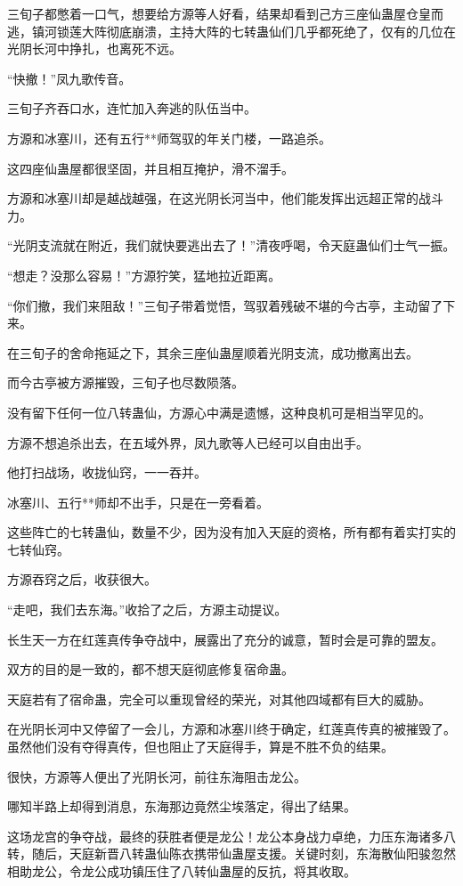 \begin{this_body}
三旬子都憋着一口气，想要给方源等人好看，结果却看到己方三座仙蛊屋仓皇而逃，镇河锁莲大阵彻底崩溃，主持大阵的七转蛊仙们几乎都死绝了，仅有的几位在光阴长河中挣扎，也离死不远。

“快撤！”凤九歌传音。

三旬子齐吞口水，连忙加入奔逃的队伍当中。

方源和冰塞川，还有五行**师驾驭的年关门楼，一路追杀。

这四座仙蛊屋都很坚固，并且相互掩护，滑不溜手。

方源和冰塞川却是越战越强，在这光阴长河当中，他们能发挥出远超正常的战斗力。

“光阴支流就在附近，我们就快要逃出去了！”清夜呼喝，令天庭蛊仙们士气一振。

“想走？没那么容易！”方源狞笑，猛地拉近距离。

“你们撤，我们来阻敌！”三旬子带着觉悟，驾驭着残破不堪的今古亭，主动留了下来。

在三旬子的舍命拖延之下，其余三座仙蛊屋顺着光阴支流，成功撤离出去。

而今古亭被方源摧毁，三旬子也尽数陨落。

没有留下任何一位八转蛊仙，方源心中满是遗憾，这种良机可是相当罕见的。

方源不想追杀出去，在五域外界，凤九歌等人已经可以自由出手。

他打扫战场，收拢仙窍，一一吞并。

冰塞川、五行**师却不出手，只是在一旁看着。

这些阵亡的七转蛊仙，数量不少，因为没有加入天庭的资格，所有都有着实打实的七转仙窍。

方源吞窍之后，收获很大。

“走吧，我们去东海。”收拾了之后，方源主动提议。

长生天一方在红莲真传争夺战中，展露出了充分的诚意，暂时会是可靠的盟友。

双方的目的是一致的，都不想天庭彻底修复宿命蛊。

天庭若有了宿命蛊，完全可以重现曾经的荣光，对其他四域都有巨大的威胁。

在光阴长河中又停留了一会儿，方源和冰塞川终于确定，红莲真传真的被摧毁了。虽然他们没有夺得真传，但也阻止了天庭得手，算是不胜不负的结果。

很快，方源等人便出了光阴长河，前往东海阻击龙公。

哪知半路上却得到消息，东海那边竟然尘埃落定，得出了结果。

这场龙宫的争夺战，最终的获胜者便是龙公！龙公本身战力卓绝，力压东海诸多八转，随后，天庭新晋八转蛊仙陈衣携带仙蛊屋支援。关键时刻，东海散仙阳骏忽然相助龙公，令龙公成功镇压住了八转仙蛊屋的反抗，将其收取。


\end{this_body}
